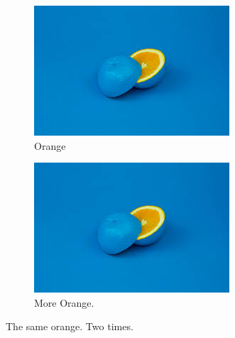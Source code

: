 \documentclass{article}
\begin{document}
	\begin{figure}[h!]
		\centering
		\begin{subfigure}[b]{0.4\linewidth}
		\includegraphics[width=\linewidth]{orange.jpg}
		    \caption{Orange}
		\end{subfigure}
	    \begin{subfigure}[b]{0.4\linewidth}
	    \includegraphics[width=\linewidth]{orange.jpg}
	        \caption{More Orange.}
	    \end{subfigure}
        \caption{The same orange. Two times.}
	    \label{fig:orange}
	\end{figure}
\end{document}
